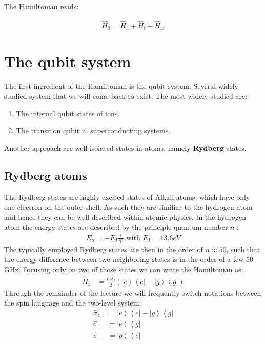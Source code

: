\documentclass[10pt]{article}
\let\cite\citep
\providecommand\citep{\cite}
\newcommand{\bra}[1]{\ensuremath{\left\langle#1\right|}}
\newcommand{\ket}[1]{\ensuremath{\left|#1\right\rangle}}
\begin{document}
The Hamiltonian reads:

\begin{align} \label{eq:totham}
\hat{H}_0 = \hat{H}_\textrm{a} + \hat{H}_\textrm{f} + \hat{H}_\textrm{af}
\end{align}

\section{The qubit system}

The first ingredient of the Hamiltonian is the qubit system. Several widely studied system that we will come back to exist. The most widely studied are:
\begin{enumerate}
\item The internal qubit states of ions.
\item The transmon qubit in superconducting systems.
\end{enumerate}

Another approach are well isolated states in atoms, namely \textbf{Rydberg} states.

\subsection{Rydberg atoms}
The Rydberg states are highly excited states of Alkali atoms, which have only one electron on the outer shell. As such they are similiar to the  hydrogen atom and hence they can be well described within atomic physics. In the hydrogen atom the energy states are described by the principle quantum number $n$ \cite{Jendrzejewski, Jendrzejewskib}:
\begin{align}
E_n = -E_I \frac{1}{n^2} \text{ with }E_I = 13.6 eV
\end{align}
The typically employed Rydberg states are then in the order of $n\approx 50$, such that the energy difference between two neighboring states is in the order of a few 50 GHz. Focusing only on two of those states we can write the Hamiltonian as:
\begin{align}
\hat{H}_\textrm{a} &= \frac{\hbar\omega_0}{2} \left(\ket{e}\bra{e}-\ket{g}\bra{g} \right)
\end{align}
Through the remainder of the lecture we will frequently switch notations between the spin language and the two-level system:
\begin{align}
\hat{\sigma}_z &= \ket{e}\bra{e}-\ket{g}\bra{g}\\
\hat{\sigma}_+ &= \ket{e}\bra{g}\\
\hat{\sigma}_- &= \ket{g}\bra{e}
\end{align}
\end{document}
